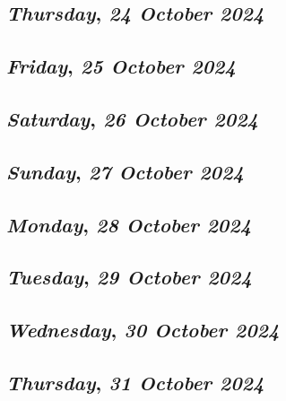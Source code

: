 \def\day{\textit{24 October 2024}}
\def\weekday{\textit{Thursday}}
\subsection*{\weekday, \day}

\def\day{\textit{25 October 2024}}
\def\weekday{\textit{Friday}}
\subsection*{\weekday, \day}

\def\day{\textit{26 October 2024}}
\def\weekday{\textit{Saturday}}
\subsection*{\weekday, \day}

\def\day{\textit{27 October 2024}}
\def\weekday{\textit{Sunday}}
\subsection*{\weekday, \day}

\def\day{\textit{28 October 2024}}
\def\weekday{\textit{Monday}}
\subsection*{\weekday, \day}

\def\day{\textit{29 October 2024}}
\def\weekday{\textit{Tuesday}}
\subsection*{\weekday, \day}

\def\day{\textit{30 October 2024}}
\def\weekday{\textit{Wednesday}}
\subsection*{\weekday, \day}

\def\day{\textit{31 October 2024}}
\def\weekday{\textit{Thursday}}
\subsection*{\weekday, \day}
